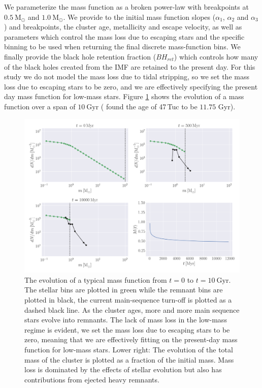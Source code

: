 We parameterize the mass function as a broken power-law with breakpoints at $0.5 \ \mathrm{M}_\odot$
and $1.0 \ \mathrm{M}_\odot$. We provide to \evolvemf{} the initial mass function slopes
($\alpha_1$, $\alpha_2$ and $\alpha_3$) and breakpoints, the cluster age, metallicity and escape
velocity, as well as parameters which control the mass loss due to escaping stars and the specific
binning to be used when returning the final discrete mass-function bins. We finally provide the
black hole retention fraction ($BH_{ret}$) which controls how many of the black holes created from the IMF are
retained to the present day. For this study we do not model the mass loss due to tidal stripping, so
we set the mass loss due to escaping stars to be zero, and we are effectively specifying the present
day mass function for low-mass stars. Figure \ref{fig:2/evolve_mf} shows the evolution of a mass
function over a span of $10 \ \mathrm{Gyr}$ (\citealt{VandenBerg2013} found the age of 47\,Tuc to be
$11.75$ Gyr).

\begin{figure}
    \centering
    \includegraphics[width=\textwidth]{figures/evolve_mf.png}
    \caption{The evolution of a typical mass function from $t=0$ to $t=10 \ \mathrm{Gyr}$. The
        stellar bins are plotted in green while the remnant bins are plotted in black, the current
        main-sequence turn-off is plotted as a dashed black line. As the cluster ages, more and more
        main sequence stars evolve into remnants. The lack of mass loss in the low-mass regime is
        evident, we set the mass loss due to escaping stars to be zero, meaning that we are
        effectively fitting on the present-day mass function for low-mass stars. Lower right: The
        evolution of the total mass of the cluster is plotted as a fraction of the initial mass.
        Mass loss is dominated by the effects of stellar evolution but also has contributions from
        ejected heavy remnants. }
    \label{fig:2/evolve_mf}
\end{figure}


